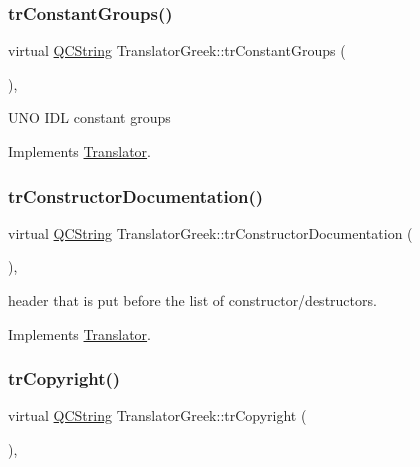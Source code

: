 \subsubsection{\texorpdfstring{trConstantGroups()}{trConstantGroups()}}
{\footnotesize\ttfamily virtual \mbox{\hyperlink{class_q_c_string}{Q\+C\+String}} Translator\+Greek\+::tr\+Constant\+Groups (\begin{DoxyParamCaption}{ }\end{DoxyParamCaption})\hspace{0.3cm}{\ttfamily [inline]}, {\ttfamily [virtual]}}

U\+NO I\+DL constant groups 

Implements \mbox{\hyperlink{class_translator}{Translator}}.

\mbox{\label{class_translator_greek_a407ce909b6f54b042b82697a21e1cac7}} 
\subsubsection{\texorpdfstring{trConstructorDocumentation()}{trConstructorDocumentation()}}
{\footnotesize\ttfamily virtual \mbox{\hyperlink{class_q_c_string}{Q\+C\+String}} Translator\+Greek\+::tr\+Constructor\+Documentation (\begin{DoxyParamCaption}{ }\end{DoxyParamCaption})\hspace{0.3cm}{\ttfamily [inline]}, {\ttfamily [virtual]}}

header that is put before the list of constructor/destructors. 

Implements \mbox{\hyperlink{class_translator}{Translator}}.

\mbox{\label{class_translator_greek_a4a609170471165d9d23deccca5344930}} 
\subsubsection{\texorpdfstring{trCopyright()}{trCopyright()}}
{\footnotesize\ttfamily virtual \mbox{\hyperlink{class_q_c_string}{Q\+C\+String}} Translator\+Greek\+::tr\+Copyright (\begin{DoxyParamCaption}{ }\end{DoxyParamCaption})\hspace{0.3cm}{\ttfamily [inline]}, {\ttfamily [virtual]}}


